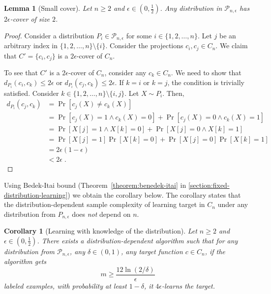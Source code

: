 \documentclass[11pt]{article}
\newtheorem{lemma}[proposition]{Lemma}
\newtheorem{corollary}[proposition]{Corollary}
\renewcommand{\P}{\mathcal{P}}
\begin{document}
\begin{lemma}[Small cover]
Let $n \ge 2$ and $\epsilon \in (0,\frac{1}{2})$. Any distribution in $\P_{n,\epsilon}$
has $2\epsilon$-cover of size $2$.
\end{lemma}

\begin{proof}
Consider a distribution $P_i \in \P_{n,\epsilon}$ for some $i \in \{1,2,\dots,n\}$.
Let $j$ be an arbitrary index in $\{1,2,\dots,n\} \setminus \{i\}$.
Consider the projections $c_i, c_j \in C_n$. We claim that $C' = \{c_i, c_j\}$
is a $2\epsilon$-cover of $C_n$.

To see that $C'$ is a $2\epsilon$-cover of $C_n$, consider any $c_k \in C_n$.
We need to show that $d_{P_i}(c_i, c_k) \le 2\epsilon$ or $d_{P_i}(c_j, c_k)
\le 2\epsilon$. If $k = i$ or $k = j$, the condition is trivially satisfied.
Consider $k \in \{1,2,\dots,n\} \setminus \{i,j\}$. Let $X \sim P_i$. Then,
\begin{align*}
d_{P_i}(c_j, c_k)
& = \Pr[c_j(X) \neq c_k(X)] \\
& = \Pr[c_j(X) = 1 \wedge c_k(X) = 0] + \Pr[c_j(X) = 0 \wedge c_k(X) = 1] \\
& = \Pr[X[j] = 1 \wedge X[k] = 0]   + \Pr[X[j] = 0 \wedge X[k] = 1] \\
& = \Pr[X[j] = 1] \Pr[X[k] = 0]  + \Pr[X[j] = 0] \Pr[X[k] = 1] \\
& = 2 \epsilon \left( 1 - \epsilon \right)  \\
& < 2 \epsilon \; .
\end{align*}
\end{proof}

Using Bedek-Itai bound (Theorem~\ref{theorem:benedek-itai} in
\autoref{section:fixed-distribution-learning}) we obtain the corollary below.
The corollary states that the distribution-dependent sample complexity
of learning target in $C_n$ under any distribution from $P_{n,\epsilon}$
does \emph{not} depend on $n$.

\begin{corollary}[Learning with knowledge of the distribution]
Let $n \ge 2$ and $\epsilon \in (0,\frac{1}{2})$.  There exists a
distribution-dependent algorithm such that for any distribution from $\P_{n,\epsilon}$,
any $\delta \in (0,1)$, any target function $c \in C_n$, if the algorithm gets
$$
m \ge \frac{12\ln(2/\delta)}{\epsilon}
$$
labeled examples, with
probability at least $1 - \delta$, it $4\epsilon$-learns the target.
\end{corollary}
\end{document}
